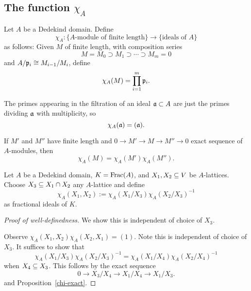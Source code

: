 \subsection{The function $\chi_A$}
\begin{df}
Let $A$ be a Dedekind domain. 
Define
\[
\chi_A:\{\text{$A$-module of finite length}\}\to \{\text{ideals of $A$}\}
\]
as follows: Given $M$ of finite length, with composition series
\[
M=M_0\supset M_1\supset \cdots \supset M_m=0
\]
and $A/\mathfrak{p}_i\cong M_{i-1}/M_i$, define
\[
\chi_A(M)=\prod_{i=1}^m \mathfrak{p}_i.
\]
\end{df}
\begin{ex}
The primes appearing in the filtration of an ideal $\mathfrak{a}\subset A$ are just the primes dividing $\mathfrak{a}$ with multiplicity, so 
\[\chi_{A}(\mathfrak{a})=(\mathfrak{a}).\]
\end{ex}
\begin{pr}
If $M'$ and $M''$ have finite length and $0\to M'\to M\to M''\to 0$ exact sequence of $A$-modules, then
\[
\chi_A(M)=\chi_A(M')\chi_A(M'').
\]
\end{pr}
\begin{df}
Let $A$ be a Dedekind domain, $K=\operatorname{Frac}(A)$, %
and $X_1,X_2\subseteq V$ be $A$-lattices. Choose $X_3\subseteq X_1\cap X_2$ any $A$-lattice and define
\[
\chi_A(X_1,X_2):=\chi_A(X_1/X_3)\chi_A(X_2/X_3)^{-1}
\]
as fractional ideals of $K$.
\end{df}
\begin{proof}[Proof of well-definedness]
We show this is independent of choice of $X_3$. %

Observe $\chi_A(X_1,X_2)\chi_A(X_2,X_1)=(1)$.
Note this is independent of choice of $X_3$. It suffices to show that
\[
\chi_A(X_1/X_3)\chi_A(X_2/X_3)^{-1}
=\chi_A(X_1/X_4)\chi_A(X_2/X_4)^{-1}
\]
when $X_4\subseteq X_3$. This follows by the exact sequence
\[
0\to X_3/X_4\to X_1/X_4\to X_1/X_3.
\]
and Proposition~\ref{chi-exact}.
\end{proof}
